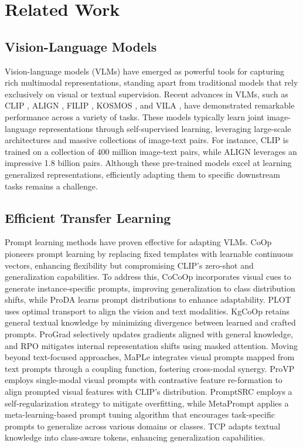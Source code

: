 \section{Related Work}
\label{sec:related work}
\subsection{Vision-Language Models}
Vision-language models (VLMs) have emerged as powerful tools for capturing rich multimodal representations, standing apart from traditional models that rely exclusively on visual or textual supervision. Recent advances in VLMs, such as CLIP \cite{clip}, ALIGN \cite{align}, FILIP \cite{filip}, KOSMOS \cite{kosmos1, kosmos2}, and VILA \cite{vila}, have demonstrated remarkable performance across a variety of tasks. These models typically learn joint image-language representations through self-supervised learning, leveraging large-scale architectures and massive collections of image-text pairs. For instance, CLIP is trained on a collection of 400 million image-text pairs, while ALIGN leverages an impressive 1.8 billion pairs. Although these pre-trained models excel at learning generalized representations, efficiently adapting them to specific downstream tasks remains a challenge.


\subsection{Efficient Transfer Learning}
Prompt learning methods have proven effective for adapting VLMs. CoOp \cite{coop} pioneers prompt learning \cite{prompt_tuning, prefix_tuning, p_tuning} by replacing fixed templates with learnable continuous vectors, enhancing flexibility but compromising CLIP's zero-shot and generalization capabilities. To address this, CoCoOp \cite{cocoop} incorporates visual cues to generate instance-specific prompts, improving generalization to class distribution shifts, while ProDA \cite{proda} learns prompt distributions to enhance adaptability. PLOT \cite{plot} uses optimal transport to align the vision and text modalities. KgCoOp \cite{kgcoop} retains general textual knowledge by minimizing divergence between learned and crafted prompts. ProGrad \cite{prograd} selectively updates gradients aligned with general knowledge, and RPO \cite{rpo} mitigates internal representation shifts using masked attention. Moving beyond text-focused approaches, MaPLe \cite{maple} integrates visual prompts mapped from text prompts through a coupling function, fostering cross-modal synergy. ProVP \cite{provp} employs single-modal visual prompts with contrastive feature re-formation to align prompted visual features with CLIP's distribution. PromptSRC \cite{promptsrc} employs a self-regularization strategy to mitigate overfitting, while MetaPrompt \cite{metaprompt} applies a meta-learning-based prompt tuning algorithm that encourages task-specific prompts to generalize across various domains or classes. TCP \cite{tcp} adapts textual knowledge into class-aware tokens, enhancing generalization capabilities.

